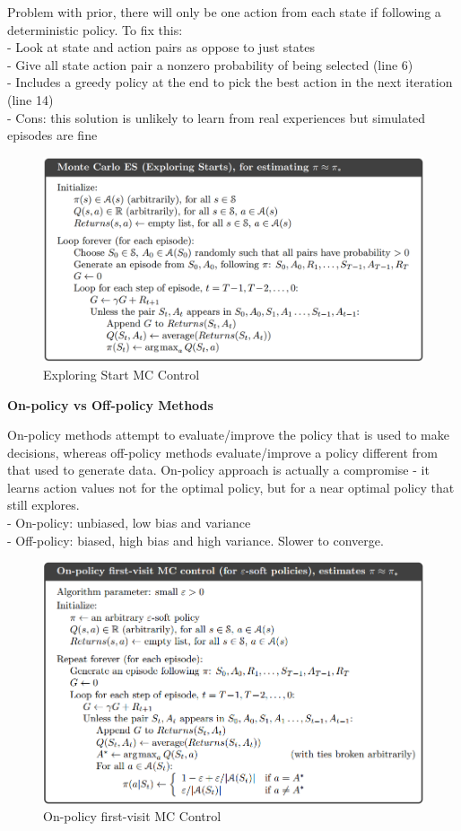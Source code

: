 \documentclass{article}
\begin{document}
\noindent
Problem with prior, there will only be one action from each state if following
a deterministic policy. To fix this: \\
- Look at state and action pairs as oppose to just states\\
- Give all state action pair a nonzero probability of being selected (line 6)\\
- Includes a greedy policy at the end to pick the best action in the next
iteration (line 14)\\
- Cons: this solution is unlikely to learn from real experiences but simulated
episodes are fine

\begin{figure}[h]
\includegraphics[scale=0.28]{exploringstart_mc}
\centering
\caption{Exploring Start MC Control}
\end{figure}

\newpage
\noindent
\textbf{On-policy vs Off-policy Methods}

\noindent
On-policy methods attempt to evaluate/improve the policy that is used to make
decisions, whereas off-policy methods evaluate/improve a policy different from
that used to generate data. On-policy approach is actually a compromise - it
learns action values not for the optimal policy, but for a near optimal policy
that still explores.\\
- On-policy: unbiased, low bias and variance\\
- Off-policy: biased, high bias and high variance. Slower to converge.\\

\begin{figure}[h]
\includegraphics[scale=0.4]{onpolicy_firstvisit_mc}
\centering
\caption{On-policy first-visit MC Control}
\end{figure}
\end{document}
